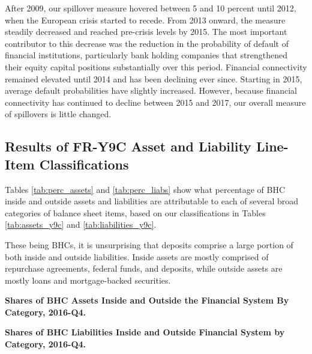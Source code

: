 After 2009, our spillover measure hovered between 5 and 10 percent until 2012, when the European crisis started to recede. From 2013 onward, the measure steadily decreased and reached pre-crisis levels by 2015. The most important contributor to this decrease was the reduction in the probability of default of financial institutions, particularly bank holding companies that strengthened their equity capital positions substantially over this period. Financial connectivity remained elevated until 2014 and has been declining ever since. Starting in 2015, average default probabilities have slightly increased. However, because financial connectivity has continued to decline between 2015 and 2017, our overall measure of spillovers is little changed.

\subsection{Results of FR-Y9C Asset and Liability Line-Item Classifications}

Tables \ref{tab:perc_assets} and \ref{tab:perc_liabs} show what percentage of BHC inside and outside assets and liabilities are attributable to each of several broad categories of balance sheet items, based on our classifications in Tables \ref{tab:assets_y9c} and \ref{tab:liabilities_y9c}.

These being BHCs, it is unsurprising that deposits comprise a large portion of both inside and outside liabilities. Inside assets are mostly comprised of repurchase agreements, federal funds, and deposits, while outside assets are mostly loans and mortgage-backed securities.

\newpage

\begin{table} [H]\centering
\def\sym#1{\ifmmode^{#1}\else\(^{#1}\)\fi}
\begin{minipage}{.48\textwidth}

\end{minipage}%
\begin{minipage}{.48\textwidth}

\end{minipage}
\centering
\caption[]{\textbf{Shares of BHC Assets Inside and Outside the Financial System By Category, 2016-Q4.}} \label{tab:perc_assets}
\end{table}

\newpage

\begin{table} [H]\centering
\def\sym#1{\ifmmode^{#1}\else\(^{#1}\)\fi}
\begin{minipage}{.48\textwidth}

\end{minipage}%
\begin{minipage}{.48\textwidth}

\end{minipage}
\caption[]{\textbf{Shares of BHC Liabilities Inside and Outside Financial System by Category, 2016-Q4.}} \label{tab:perc_liabs}
\end{table}

